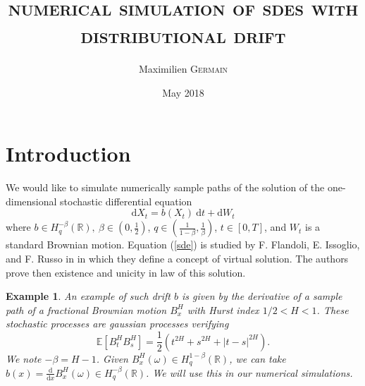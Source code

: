 \documentclass[11pt]{article}
\newcommand{\de}[2]{\frac{\mathrm{d} #1}{\mathrm{d} #2}}
\newtheorem{ex}{Example}
\newcommand{\R}{\mathbb{R}}
\newcommand{\E}{\mathbb{E}}
\newcommand{\di}{\mathrm{d}}
\begin{document}
\title{\Large \textsc{\textbf{numerical simulation of sdes with distributional drift}}} \author{Maximilien \textsc{Germain} \date{May 2018}}
\maketitle

\section{Introduction}
    
    \paragraph{}
    We would like to simulate numerically sample paths of the solution of the one-dimensional stochastic differential equation
    \begin{equation} \label{sde}
    \di X_t = b(X_t)\ \di t + \di W_t
    \end{equation}
    where $b\in H^{-\beta}_q(\R),\ \beta\in\left(0,\frac{1}{2}\right)$, $q\in\left(\frac{1}{1-\beta},\frac{1}{\beta}\right)$, $t\in[0,T]$, and $W_t$ is a standard Brownian motion. Equation (\ref{sde}) is studied by F. Flandoli, E. Issoglio, and F. Russo in \cite{Fla-Iss-Rus-2017} in which they define a concept of virtual solution. The authors prove then existence and unicity in law of this solution. 
    
    \begin{ex}
        An example of such drift $b$ is given by the derivative of a sample path of a fractional Brownian motion $B^H_x$ with Hurst index $1/2<H<1$. These stochastic processes are gaussian processes verifying $$\E\left[B_t^HB_s^H\right]=\frac{1}{2}\left(t^{2H}+s^{2H}+|t-s|^{2H}\right).$$ We note $-\beta = H - 1$. Given $B^H_x(\omega)\in H^{1-\beta}_q(\R)$, we can take $b(x) = \de{}{x}B^H_x(\omega)\in H^{-\beta}_q(\R)$. We will use this in our numerical simulations.
    \end{ex}    
    
\end{document}
